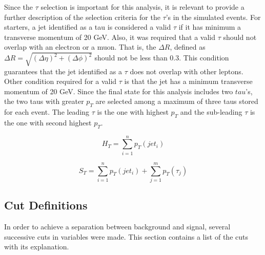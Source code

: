 Since the $\tau$ selection is important for this analysis, it is relevant to provide a further description of the selection criteria for the $\tau$'s in the simulated events. For starters, a jet identified as a tau is considered a valid $\tau$ if it has minimum a transverse momentum of 20 GeV. Also, it was required that a valid $\tau$ should not overlap with an electron or a muon. That is, the $\Delta R$, defined as $\Delta R = \sqrt{(\Delta \eta)^2 + (\Delta \phi)^2}$ should not be less than 0.3. This condition guarantees that the jet identified as a $\tau$ does not overlap with other leptons. Other condition required for a valid $\tau$ is that the jet has a minimum transverse momentum of 20 GeV. Since the final state for this analysis includes two $tau$'s, the two taus with greater $p_{T}$ are selected among a maximum of three taus stored for each event. The leading $\tau$ is the one with highest $p_{T}$ and the sub-leading $\tau$ is the one with second highest $p_{T}$.

\begin{equation}
 H_{T} = \sum_{i=1}^{n} p_{T}(jet_{i})
 \label{eq: HT}
\end{equation}

\begin{equation}
 S_{T} = \sum_{i=1}^{n} p_{T}(jet_{i}) + \sum_{j=1}^{m} p_{T}(\tau_{j})
 \label{eq: ST}
\end{equation}

\subsection{Cut Definitions}

In order to achieve a separation between background and signal, several successive cuts in variables were made. This section contains a list of the cuts with its explanation. 
